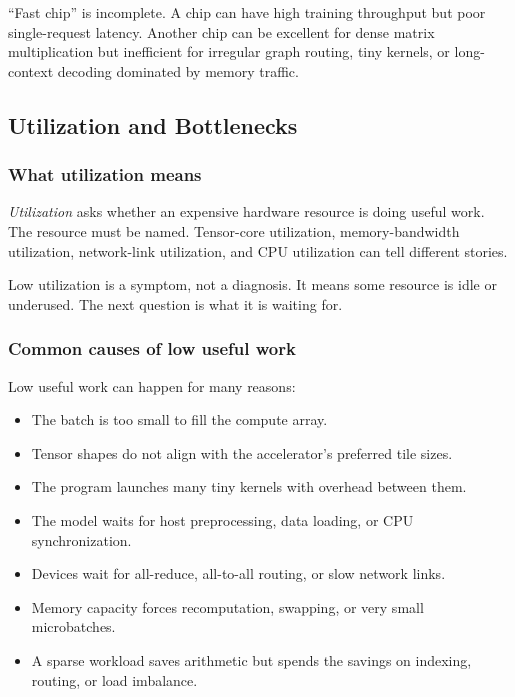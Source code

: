 \begin{aside}
``Fast chip'' is incomplete. A chip can have high training throughput but poor single-request latency. Another chip can be excellent for dense matrix multiplication but inefficient for irregular graph routing, tiny kernels, or long-context decoding dominated by memory traffic.
\end{aside}

\subsection{Utilization and Bottlenecks}

\subsubsection{What utilization means}

\emph{Utilization} asks whether an expensive hardware resource is doing useful work. The resource must be named. Tensor-core utilization, memory-bandwidth utilization, network-link utilization, and CPU utilization can tell different stories.

Low utilization is a symptom, not a diagnosis. It means some resource is idle or underused. The next question is what it is waiting for.

\subsubsection{Common causes of low useful work}

Low useful work can happen for many reasons:

\begin{itemize}[leftmargin=*]
  \item The batch is too small to fill the compute array.
  \item Tensor shapes do not align with the accelerator's preferred tile sizes.
  \item The program launches many tiny kernels with overhead between them.
  \item The model waits for host preprocessing, data loading, or CPU synchronization.
  \item Devices wait for all-reduce, all-to-all routing, or slow network links.
  \item Memory capacity forces recomputation, swapping, or very small microbatches.
  \item A sparse workload saves arithmetic but spends the savings on indexing, routing, or load imbalance.
\end{itemize}

